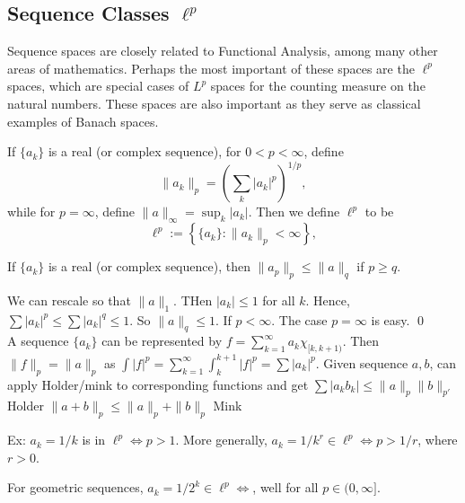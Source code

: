 \subsection{Sequence Classes $\ell^p$}

Sequence spaces are closely related to Functional Analysis, among many other areas of mathematics. Perhaps the most important of these spaces are the $\ell^p$ spaces, which are special cases of $L^p$ spaces for the counting measure on the natural numbers. These spaces are also important as they serve as classical examples of Banach spaces. 


\begin{dfn}[$\ell^p$]
If $\{a_k\}$ is a real (or complex sequence), for $0<p<\infty$, define
	\[
	\| a_k \|_p = \left( \sum_k |a_k|^p \right)^{1/p},
	\]
while for $p=\infty$, define $\|a\|_\infty= \sup_k |a_k|$. Then we define $\ell^p$ to be
	\[
	\ell^p:= \left\{ \{a_k\} \colon \|a_k\|_p< \infty \right\},
	\]
\end{dfn}















\begin{prop}
If $\{a_k\}$ is a real (or complex sequence), then $\|a_p\|_p \leq \|a\|_q$ if $p \geq q$. 
\end{prop}

\pf We can rescale so that $\|a\|_1$. THen $|a_k| \leq 1$ for all $k$. Hence, $\sum |a_k|^p \leq \sum |a_k|^q \leq 1$. So $\|a\|_q \leq 1$. If $p<\infty$. The case $p=\infty$ is easy. \qed \\




A sequence $\{a_k\}$ can be represented by $f= \sum_{k=1}^\infty a_k \chi_{[k,k+1)}$. Then $\|f\|_p= \|a\|_p$ as $\int |f|^p= \sum_{k=1}^\infty \int_k^{k+1} |f|^p = \sum |a_k|^p$. Given sequence $a,b$, can apply Holder/mink to corresponding functions and get 
$\sum |a_kb_k| \leq \|a\|_p \|b\|_{p'}$ Holder
$\|a+b\|_p \leq \|a\|_p + \|b\|_p$ Mink




Ex: $a_k=1/k$ is in $\ell^p \iff p>1$. More generally, $a_k= 1/k^r \in \ell^p \iff p>1/r$, where $r>0$.


For geometric sequences, $a_k= 1/2^k \in \ell^p \iff $, well for all $p \in (0,\infty]$. 


